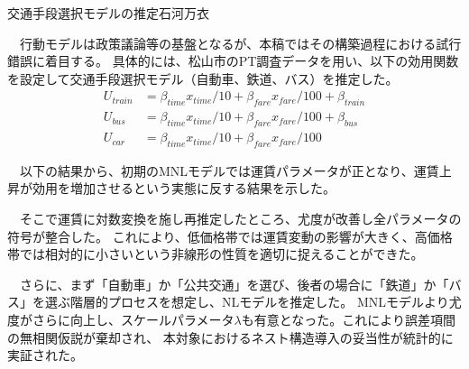 \clearpage
\begin{column}{交通手段選択モデルの推定}{石河万衣}
    
　行動モデルは政策議論等の基盤となるが、本稿ではその構築過程における試行錯誤に着目する。
具体的には、松山市のPT調査データを用い、以下の効用関数を設定して交通手段選択モデル（自動車、鉄道、バス）を推定した。
\begin{align*}
U_{train} &= \beta_{time} x_{time} / 10 + \beta_{fare} x_{fare} / 100 + \beta_{train}\\
U_{bus} &= \beta_{time} x_{time} / 10 + \beta_{fare} x_{fare} / 100 + \beta_{bus}\\
U_{car} &= \beta_{time} x_{time} / 10 + \beta_{fare} x_{fare} / 100
\end{align*}

　以下の結果から、初期のMNLモデルでは運賃パラメータが正となり、運賃上昇が効用を増加させるという実態に反する結果を示した。

　そこで運賃に対数変換を施し再推定したところ、尤度が改善し全パラメータの符号が整合した。
これにより、低価格帯では運賃変動の影響が大きく、高価格帯では相対的に小さいという非線形の性質を適切に捉えることができた。

　さらに、まず「自動車」か「公共交通」を選び、後者の場合に「鉄道」か「バス」を選ぶ階層的プロセスを想定し、NLモデルを推定した。
MNLモデルより尤度がさらに向上し、スケールパラメータ$\lambda$も有意となった。これにより誤差項間の無相関仮説が棄却され、
本対象におけるネスト構造導入の妥当性が統計的に実証された。

\begin{center}
    \label{tab:integrated_model}
      
    \small
    \setlength{\tabcolsep}{3pt}


\end{center}
\end{column}
